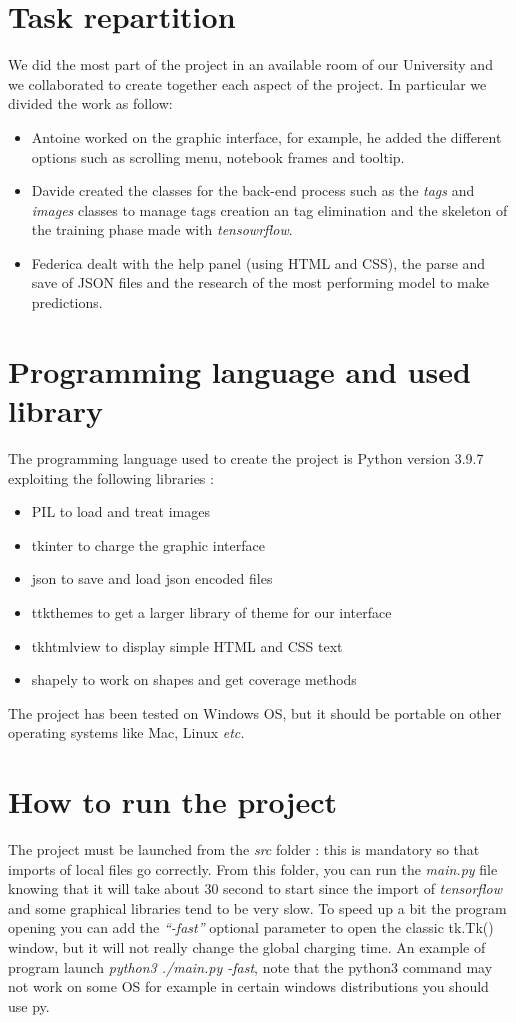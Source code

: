 \documentclass[a4paper,12pt]{article}
\def\etc{\textit{etc.}}
\begin{document}
\section{Task repartition}
We did the most part of the project in an available room of our University and we collaborated to create together each aspect of the project.
In particular we divided the work as follow:
\begin{itemize}
  \item Antoine worked on the graphic interface, for example, he added the different options such as scrolling menu, notebook frames and tooltip.
  \item Davide created the classes for the back-end process such as the \textit{tags} and \textit{images} classes to manage tags creation an tag elimination and the skeleton of the training phase made with \textit{tensowrflow}.
  \item Federica dealt with the help panel (using HTML and CSS), the parse and save of JSON files and the research of the most performing model to make predictions. 
\end{itemize}

\section{Programming language and used library}
The programming language used to create the project is Python version 3.9.7 exploiting the following libraries :
\begin{itemize}
  \item PIL to load and treat images
  \item tkinter to charge the graphic interface
  \item json to save and load json encoded files
  \item ttkthemes to get a larger library of theme for our interface
  \item tkhtmlview to display simple HTML and CSS text
  \item shapely to work on shapes and get coverage methods
\end{itemize}
The project has been tested on Windows OS, but it should be portable on other operating systems like Mac, Linux \etc{}

\section{How to run the project}
The project must be launched from the \textit{src} folder : this is mandatory so that imports of local
files go correctly. From this folder, you can run the  \textit{main.py}  file knowing that it will take about 30 second to start since the import of \textit{tensorflow} and some graphical libraries tend to be very slow. To speed up a bit the program opening you can add the \textit{“-fast”}  optional parameter  to open the classic tk.Tk() window, but it will not really change the global charging time. 
An example of program launch \textit{python3 ./main.py -fast},  note that the  python3 command may not work on
some OS for example in certain windows distributions you should use py.
\end{document}
